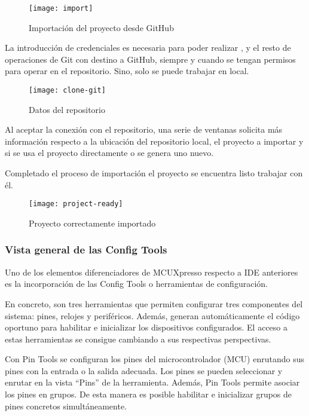 \begin{figure}[!h]
  \centering
  \texttt{[image: import]}
  \caption{Importación del proyecto desde GitHub} \label{fig:import}
\end{figure}

La introducción de credenciales es necesaria para poder realizar
,  y el resto de operaciones de Git
con destino a GitHub, siempre y cuando se tengan permisos para operar en el
repositorio. Sino, solo se puede trabajar en local.

\begin{figure}[!h]
  \centering
  \texttt{[image: clone-git]}
  \caption{Datos del repositorio} \label{fig:clone-git}
\end{figure}

Al aceptar la conexión con el repositorio, una serie de ventanas solicita más
información respecto a la ubicación del repositorio local, el proyecto a 
importar y si se usa el proyecto directamente o se genera uno nuevo.

Completado el proceso de importación el proyecto se encuentra listo 
trabajar con él.

\begin{figure}[!h]
  \centering
  \texttt{[image: project-ready]}
  \caption{Proyecto correctamente importado} \label{fig:project-ready}
\end{figure}

\subsubsection{Vista general de las Config Tools} \label{sec:config-tools}
Uno de los elementos diferenciadores de MCUXpresso respecto a IDE anteriores
es la incorporación de las Config Tools o herramientas de configuración.

En concreto, son tres herramientas que permiten configurar tres componentes
del sistema: pines, relojes y periféricos. Además, generan automáticamente el
código oportuno para habilitar e inicializar los dispositivos configurados. El
acceso a estas herramientas se consigue cambiando a sus respectivas perspectivas.

Con Pin Tools se configuran los pines del microcontrolador (MCU) enrutando
sus pines con la entrada o la salida adecuada. Los pines se pueden seleccionar y
enrutar en la vista ``Pins'' de la herramienta. Además, Pin Tools permite asociar
los pines en grupos. De esta manera es posible habilitar e inicializar grupos
de pines concretos simultáneamente.

